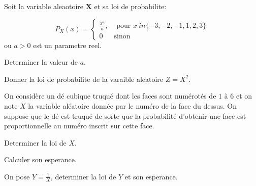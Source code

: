 \documentclass[11pt,largemargins]{homework}
\begin{document}
\maketitle


Soit la variable aleaotoire $\mathbf{X}$  et sa loi de probabilite:

\begin{equation}
  P_X(x) = \begin{cases}
    \frac{x^2}{a},& \text{ pour } x \ in \{-3,-2,-1,1,2,3\}\\[4pt]
    0             & \text{sinon}
  \end{cases}
\end{equation}
ou $a > 0$ est un parametre reel.

\begin{arabicparts}
    \item Determiner la valeur de $a$.
    \item Donner la loi de probabilite de la varaible aleatoire $Z = X^2$.
\end{arabicparts}

On considère un dé cubique truqué dont les faces sont numérotés de $1$ à $6$ et
on note $X$ la variable aléatoire donnée par le numéro de la face du dessus. On suppose que le dé est truqué de sorte que la probabilité d'obtenir une face est proportionnelle au numéro inscrit sur cette face.


\begin{arabicparts}
\item Determiner la loi de $X$.
\item Calculer son esperance.
\item On pose $Y = \frac{1}{X}$, determiner la loi de $Y$ et son esperance.
  
\end{arabicparts}
\end{document}
